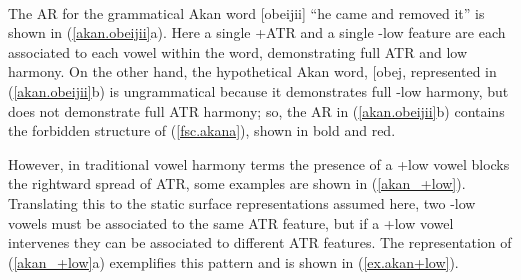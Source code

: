 \documentclass[,doc,floatsintext]{apa6}
\theoremstyle{definition}
\theoremstyle{definition}
\theoremstyle{definition}
\theoremstyle{remark}
\begin{document}
\begin{exe}
\label{akan.obeijii} \\
\end{exe}

The AR for the grammatical Akan word {[}obeijii{]} \enquote{he came and
removed it} is shown in (\ref{akan.obeijii}a). Here a single +ATR and a
single -low feature are each associated to each vowel within the word,
demonstrating full ATR and low harmony. On the other hand, the
hypothetical Akan word, {[}obej\textipa{II}{]}, represented in
(\ref{akan.obeijii}b) is ungrammatical because it demonstrates full -low
harmony, but does not demonstrate full ATR harmony; so, the AR in
(\ref{akan.obeijii}b) contains the forbidden structure of
(\ref{fsc.akana}), shown in bold and red.

However, in traditional vowel harmony terms the presence of a +low vowel
blocks the rightward spread of ATR, some examples are shown in
(\ref{akan_+low}). Translating this to the static surface
representations assumed here, two -low vowels must be associated to the
same ATR feature, but if a +low vowel intervenes they can be associated
to different ATR features. The representation of (\ref{akan_+low}a)
exemplifies this pattern and is shown in (\ref{ex.akan+low}).
\end{document}

